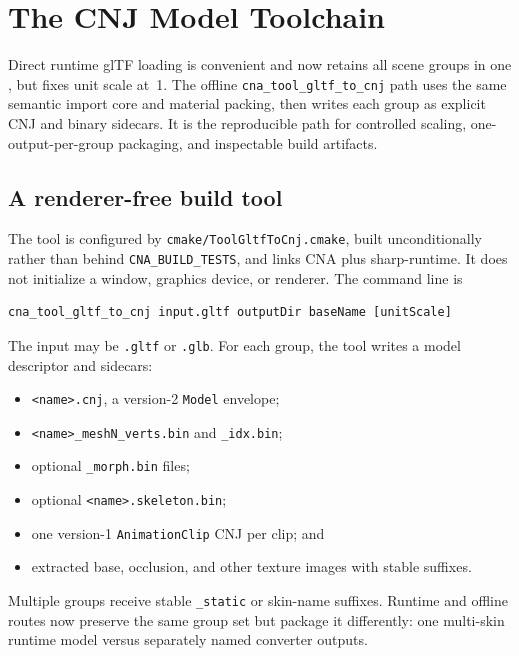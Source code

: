 \chapter{The CNJ Model Toolchain}
\label{ch:cnj-model-toolchain}

Direct runtime glTF loading is convenient and now retains all scene groups in one
, but fixes unit scale at~1. The offline
\texttt{cna\_tool\_gltf\_to\_cnj} path uses the same semantic import core and material packing,
then writes each group as explicit CNJ and binary sidecars. It is the reproducible path for
controlled scaling, one-output-per-group packaging, and inspectable build artifacts.

\section{A renderer-free build tool}

The tool is configured by \texttt{cmake/ToolGltfToCnj.cmake}, built unconditionally rather than
behind \texttt{CNA\_BUILD\_TESTS}, and links CNA plus sharp-runtime. It does not initialize a
window, graphics device, or renderer. The command line is

\begin{lstlisting}
cna_tool_gltf_to_cnj input.gltf outputDir baseName [unitScale]
\end{lstlisting}

The input may be \texttt{.gltf} or \texttt{.glb}. For each group, the tool writes a model
descriptor and sidecars:

\begin{itemize}
  \item \texttt{<name>.cnj}, a version-2 \texttt{Model} envelope;
  \item \texttt{<name>\_meshN\_verts.bin} and \texttt{\_idx.bin};
  \item optional \texttt{\_morph.bin} files;
  \item optional \texttt{<name>.skeleton.bin};
  \item one version-1 \texttt{AnimationClip} CNJ per clip; and
  \item extracted base, occlusion, and other texture images with stable suffixes.
\end{itemize}

Multiple groups receive stable \texttt{\_static} or skin-name suffixes. Runtime and offline
routes now preserve the same group set but package it differently: one multi-skin runtime model
versus separately named converter outputs.

